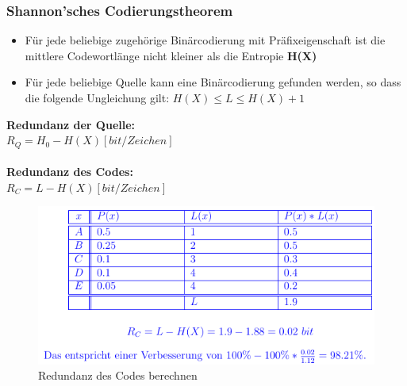 \subsubsection{Shannon'sches Codierungstheorem}
\begin{itemize}
	\item Für jede beliebige zugehörige Binärcodierung mit Präfixeigenschaft ist die mittlere Codewortlänge nicht kleiner als die Entropie \textbf{H(X)}
	\item Für jede beliebige Quelle kann eine Binärcodierung gefunden werden, so dass die folgende Ungleichung gilt:
		\subitem $H(X)\leqslant L\leqslant  H(X)+1$
\end{itemize}
\textbf{Redundanz der Quelle:} \\
$R_Q=H_0-H(X)[bit/Zeichen]$ \\
\\
\textbf{Redundanz des Codes:} \\
$R_C=L-H(X)[bit/Zeichen]$ \\
\begin{figure}[h!]
	\centering
	\begin{minipage}[t]{0.7\textwidth}
		\centering
		\includegraphics[width=0.9\linewidth]{images/redundanzdescodes}
		\caption{Redundanz des Codes berechnen}
		\label{fig:redundanzdescodes}
	\end{minipage}
\end{figure}
\clearpage

